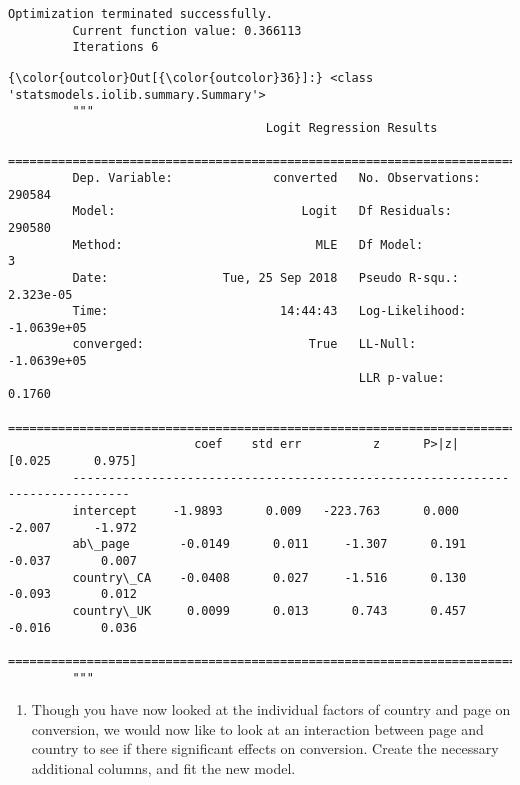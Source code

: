 \documentclass[11pt]{article}
\providecommand{\tightlist}{%
      \setlength{\itemsep}{0pt}\setlength{\parskip}{0pt}}
\begin{document}
    \begin{Verbatim}[commandchars=\\\{\}]
Optimization terminated successfully.
         Current function value: 0.366113
         Iterations 6

    \end{Verbatim}

\begin{Verbatim}[commandchars=\\\{\}]
{\color{outcolor}Out[{\color{outcolor}36}]:} <class 'statsmodels.iolib.summary.Summary'>
         """
                                    Logit Regression Results                           
         ==============================================================================
         Dep. Variable:              converted   No. Observations:               290584
         Model:                          Logit   Df Residuals:                   290580
         Method:                           MLE   Df Model:                            3
         Date:                Tue, 25 Sep 2018   Pseudo R-squ.:               2.323e-05
         Time:                        14:44:43   Log-Likelihood:            -1.0639e+05
         converged:                       True   LL-Null:                   -1.0639e+05
                                                 LLR p-value:                    0.1760
         ==============================================================================
                          coef    std err          z      P>|z|      [0.025      0.975]
         ------------------------------------------------------------------------------
         intercept     -1.9893      0.009   -223.763      0.000      -2.007      -1.972
         ab\_page       -0.0149      0.011     -1.307      0.191      -0.037       0.007
         country\_CA    -0.0408      0.027     -1.516      0.130      -0.093       0.012
         country\_UK     0.0099      0.013      0.743      0.457      -0.016       0.036
         ==============================================================================
         """
\end{Verbatim}
            
    \begin{enumerate}
\def\labelenumi{\alph{enumi}.}
\setcounter{enumi}{7}
\tightlist
\item
  Though you have now looked at the individual factors of country and
  page on conversion, we would now like to look at an interaction
  between page and country to see if there significant effects on
  conversion. Create the necessary additional columns, and fit the new
  model.
\end{enumerate}
\end{document}
